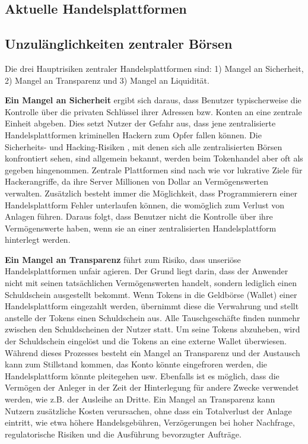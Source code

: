 \documentclass[UTF8,nofonts]{article}
\begin{document}
\begin{multicols}{2}
\section{Aktuelle Handelsplattformen\label{sec:current_exchange_landscape}}

\subsection{Unzulänglichkeiten zentraler Börsen}
Die drei Hauptrisiken zentraler Handelsplattformen sind: 1) Mangel an Sicherheit, 2) Mangel an Transparenz und 3) Mangel an Liquidität.

\textbf{Ein Mangel an Sicherheit} ergibt sich daraus, dass Benutzer typischerweise die Kontrolle über die privaten Schlüssel ihrer Adressen bzw. Konten an eine zentrale Einheit abgeben. Dies setzt Nutzer der Gefahr aus, dass jene zentralisierte Handelsplattformen kriminellen Hackern zum Opfer fallen können. Die Sicherheits- und Hacking-Risiken \cite{coincheckhack}  \cite{mcmillan2014inside}, mit denen sich alle zentralisierten Börsen konfrontiert sehen, sind allgemein bekannt, werden beim Tokenhandel aber oft als gegeben hingenommen. Zentrale Plattformen sind nach wie vor lukrative Ziele für Hackerangriffe, da ihre Server Millionen von Dollar an Vermögenswerten verwalten. Zusätzlich besteht immer die Möglichkeit, dass Programmierern einer Handelsplattform Fehler unterlaufen können, die womöglich zum Verlust von Anlagen führen. Daraus folgt, dass Benutzer nicht die Kontrolle über ihre Vermögenswerte haben, wenn sie an einer zentralisierten Handelsplattform hinterlegt werden.

\textbf{Ein Mangel an Transparenz} führt zum Risiko, dass unseriöse Handelsplattformen unfair agieren. Der Grund liegt darin, dass der Anwender nicht mit seinen tatsächlichen Vermögenswerten handelt, sondern lediglich einen Schuldschein ausgestellt bekommt. Wenn Tokens in die Geldbörse (Wallet) einer Handelsplattform eingezahlt werden, übernimmt diese die Verwahrung und stellt anstelle der Tokens einen Schuldschein aus. Alle Tauschgeschäfte finden nunmehr zwischen den Schuldscheinen der Nutzer statt. Um seine Tokens abzuheben, wird der Schuldschein eingelöst und die Tokens an eine externe Wallet überwiesen. Während dieses Prozesses besteht ein Mangel an Transparenz und der Austausch kann zum Stillstand kommen, das Konto könnte eingefroren werden, die Handelsplattform könnte pleitegehen usw. Ebenfalls ist es möglich, dass die Vermögen der Anleger in der Zeit der Hinterlegung für andere Zwecke verwendet werden, wie z.B. der Ausleihe an Dritte. Ein Mangel an Transparenz kann Nutzern zusätzliche Kosten verursachen, ohne dass ein Totalverlust der Anlage eintritt, wie etwa höhere Handelsgebühren, Verzögerungen bei hoher Nachfrage, regulatorische Risiken und die Ausführung bevorzugter Aufträge.


\end{multicols}
\end{document}
